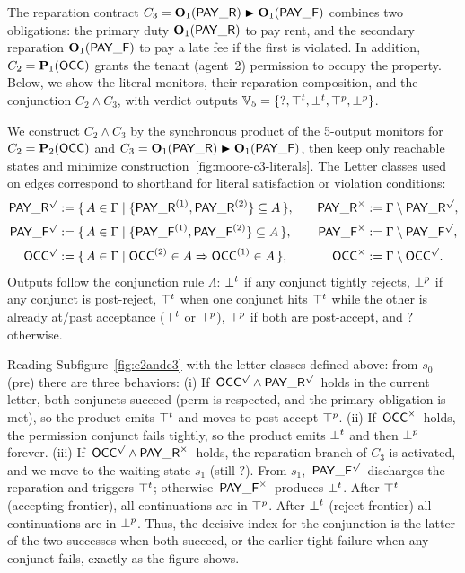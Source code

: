 \begin{example}
\label{ex:moore-c3-literals}
The reparation contract $C_3=\obl[1]{\PAY}\repair\obl[1]{\PAYF}$ combines two obligations:
the primary duty $\obl[1]{\PAY}$ to pay rent,
and the secondary reparation $\obl[1]{\PAYF}$ to pay a late fee if the first is violated.
In addition, $C_2=\perm[1]{\OCC}$ grants the tenant (agent~2) permission to occupy the property.
Below, we show the literal monitors, their reparation composition, and the conjunction $C_2\wedge C_3$,
with verdict outputs $\tightverdicts=\{\mathsf{?},\topt,\bott,\topp,\botp\}$.


We construct $C_2 \wedge C_3$ by the synchronous product of the 5-output monitors for $C_2=\perm[2]{\OCC}$ and $C_3=\obl[1]{\PAY}\repair\obl[1]{\PAYF}$, then keep only
reachable states and minimize construction~\ref{fig:moore-c3-literals}.
The Letter classes used on edges correspond to  shorthand for literal satisfaction or violation conditions:
\[
\begin{aligned}
\PAY^\surd   &:= \{\,A\in\Gamma \mid \{\PAY^{(1)},\PAY^{(2)}\}\subseteq A\,\}, 
&\quad \PAY^\times   &:= \Gamma\setminus \PAY^\surd,\\[2pt]
\PAYF^\surd  &:= \{\,A\in\Gamma \mid \{\PAYF^{(1)},\PAYF^{(2)}\}\subseteq A\,\},
&\quad \PAYF^\times  &:= \Gamma\setminus \PAYF^\surd,\\[2pt]
\OCC^{\surd} &:= \{\,A\in\Gamma \mid \OCC^{(2)}\in A \Rightarrow \OCC^{(1)}\in A\,\},
&\quad \OCC^{\times} &:= \Gamma\setminus \OCC^{\surd}.
\end{aligned}
\]
Outputs follow the conjunction rule $\Lambda$:
$\bott$ if any conjunct tightly rejects, $\botp$ if any conjunct is post-reject,
$\topt$ when one conjunct hits $\topt$ while the other is already at/past acceptance
($\topt$ or $\topp$), $\topp$ if both are post-accept, and $\mathsf{?}$ otherwise.

Reading Subfigure~\ref{fig:c2andc3} with the letter classes defined above: from $s_0$ (pre) there are three behaviors:
(i) If \,$\OCC^\surd \land \PAY^\surd$\ holds in the current letter, both conjuncts succeed (perm is respected, and the primary obligation is met), so the product emits $\topt$
and moves to post-accept $\topp$.
(ii) If \,$\OCC^{\times}$\ holds, the permission conjunct fails tightly, so the product
emits $\bott$ and then $\botp$ forever.
(iii) If \,$\OCC^\surd \land \PAY^{\times}$\ holds, the reparation branch of $C_3$
is activated, and we move to the waiting state $s_1$ (still $\mathsf{?}$). From $s_1$,
\,$\PAYF^\surd$\ discharges the reparation and triggers $\topt$; otherwise
\,$\PAYF^{\times}$\ produces $\bott$. After $\topt$ (accepting frontier), all continuations
are in $\topp$. After $\bott$ (reject frontier) all continuations are in $\botp$.
Thus, the decisive index for the conjunction is the latter of the two successes when both succeed, or the earlier tight failure when any conjunct fails, exactly as the figure shows.
\begin{figure}[h!]
\centering
\captionsetup[subfigure]{justification=centering}


\end{figure}
\end{example}
